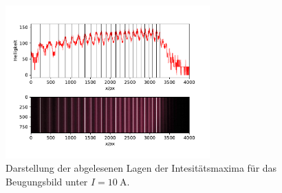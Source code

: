 \begin{figure}
  \centering
  \includegraphics[width = 0.7\textwidth]{../Messdaten/plots/peaks_rot_sigma_10.pdf}
  \caption{Darstellung der abgelesenen Lagen der Intesitätsmaxima für das Beugungsbild unter $I =\SI{10}{\ampere}$.}
  \label{fig: peaks_rot_10}
\end{figure}

